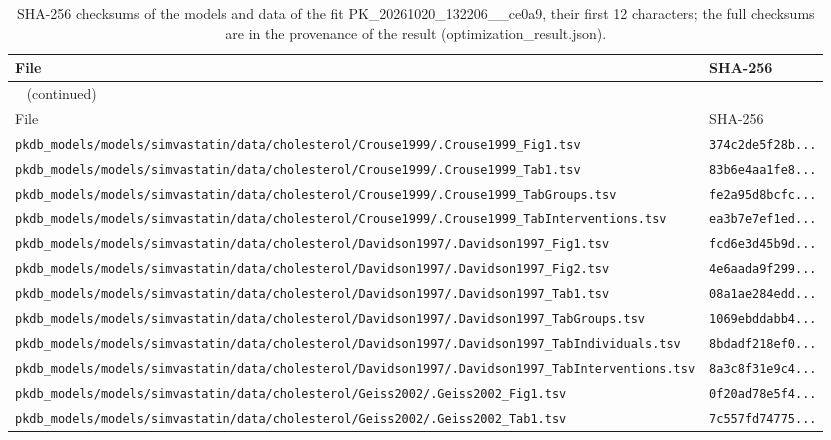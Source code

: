 \documentclass{article}
\begin{document}
\begin{longtable}{ll}
\caption{SHA-256 checksums of the models and data of the fit PK\_20261020\_132206\_\_ce0a9, their first 12 characters; the full checksums are in the provenance of the result (optimization\_result.json).}\label{tab:checksums:PK_20261020_132206__ce0a9} \\
\toprule
File & SHA-256 \\
\midrule
\endfirsthead
\multicolumn{2}{l}{\small\tablename~\thetable{} (continued)} \\
\toprule
File & SHA-256 \\
\midrule
\endhead
\bottomrule
\endlastfoot
\texttt{pkdb\_models/models/simvastatin/data/cholesterol/Crouse1999/.Crouse1999\_Fig1.tsv} & \texttt{374c2de5f28b...} \\
\texttt{pkdb\_models/models/simvastatin/data/cholesterol/Crouse1999/.Crouse1999\_Tab1.tsv} & \texttt{83b6e4aa1fe8...} \\
\texttt{pkdb\_models/models/simvastatin/data/cholesterol/Crouse1999/.Crouse1999\_TabGroups.tsv} & \texttt{fe2a95d8bcfc...} \\
\texttt{pkdb\_models/models/simvastatin/data/cholesterol/Crouse1999/.Crouse1999\_TabInterventions.tsv} & \texttt{ea3b7e7ef1ed...} \\
\texttt{pkdb\_models/models/simvastatin/data/cholesterol/Davidson1997/.Davidson1997\_Fig1.tsv} & \texttt{fcd6e3d45b9d...} \\
\texttt{pkdb\_models/models/simvastatin/data/cholesterol/Davidson1997/.Davidson1997\_Fig2.tsv} & \texttt{4e6aada9f299...} \\
\texttt{pkdb\_models/models/simvastatin/data/cholesterol/Davidson1997/.Davidson1997\_Tab1.tsv} & \texttt{08a1ae284edd...} \\
\texttt{pkdb\_models/models/simvastatin/data/cholesterol/Davidson1997/.Davidson1997\_TabGroups.tsv} & \texttt{1069ebddabb4...} \\
\texttt{pkdb\_models/models/simvastatin/data/cholesterol/Davidson1997/.Davidson1997\_TabIndividuals.tsv} & \texttt{8bdadf218ef0...} \\
\texttt{pkdb\_models/models/simvastatin/data/cholesterol/Davidson1997/.Davidson1997\_TabInterventions.tsv} & \texttt{8a3c8f31e9c4...} \\
\texttt{pkdb\_models/models/simvastatin/data/cholesterol/Geiss2002/.Geiss2002\_Fig1.tsv} & \texttt{0f20ad78e5f4...} \\
\texttt{pkdb\_models/models/simvastatin/data/cholesterol/Geiss2002/.Geiss2002\_Tab1.tsv} & \texttt{7c557fd74775...} \\

\end{longtable}
\end{document}
